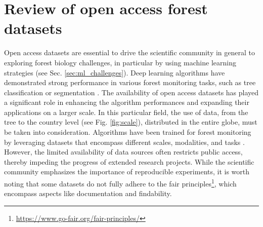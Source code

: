 \documentclass{CUP-JNL-DTM}%
\theoremstyle{definition}
\numberwithin{equation}{section}
\begin{document}
\section[Review of open access forest datasets]{Review of open access forest datasets}
\label{sec:review}

Open access datasets are essential to drive the scientific community in general to exploring forest biology challenges, in particular by using machine learning strategies (see Sec. \ref{sec:ml_challenges}).
Deep learning algorithms have demonstrated strong performance in various forest monitoring tasks, such as tree classification or segmentation \cite{kattenborn_review_2021}.
The availability of open access datasets has played a significant role in enhancing the algorithm performances and expanding their applications on a larger scale.
In this particular field, the use of data, from the tree to the country level (see Fig. \ref{fig:scale}), distributed in the entire globe, must be taken into consideration.
Algorithms have been trained for forest monitoring by leveraging datasets that encompass different scales, modalities, and tasks \cite{guimaraes_forestry_2020, kattenborn_review_2021, michalowska_review_2021}.
However, the limited availability of data sources often restricts public access, thereby impeding the progress of extended research projects.
While the scientific community emphasizes the importance of reproducible experiments, it is worth noting that some datasets do not fully adhere to the fair principles\footnote{\url{https://www.go-fair.org/fair-principles/}}, which encompass aspects like documentation and findability.
\end{document}
